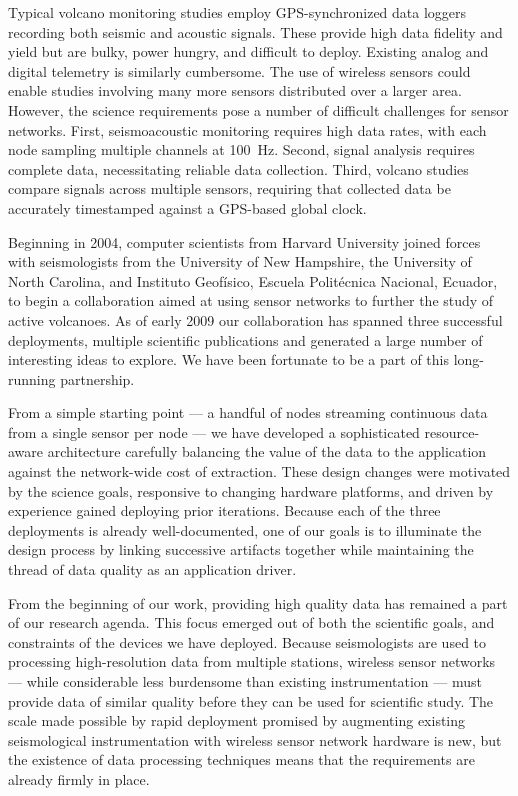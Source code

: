 
Typical volcano monitoring studies employ GPS-synchronized data loggers
recording both seismic and acoustic signals. These provide high data fidelity
and yield but are bulky, power hungry, and difficult to deploy. Existing
analog and digital telemetry is similarly cumbersome.  The use of wireless
sensors could enable studies involving many more sensors distributed over a
larger area. However, the science requirements pose a number of difficult
challenges for sensor networks.  First, seismoacoustic monitoring requires
high data rates, with each node sampling multiple channels at 100~Hz. Second,
signal analysis requires complete data, necessitating reliable data
collection. Third, volcano studies compare signals across multiple sensors,
requiring that collected data be accurately timestamped against a GPS-based
global clock.



Beginning in 2004, computer scientists from Harvard University joined forces
with seismologists from the University of New Hampshire, the University of
North Carolina, and Instituto Geof\'{i}sico, Escuela Polit\'{e}cnica
Nacional, Ecuador, to begin a collaboration aimed at using sensor networks to
further the study of active volcanoes. As of early 2009 our collaboration has
spanned three successful deployments, multiple scientific publications and
generated a large number of interesting ideas to explore.  We have been
fortunate to be a part of this long-running partnership.

From a simple starting point --- a handful of nodes streaming continuous data
from a single sensor per node --- we have developed a sophisticated
resource-aware architecture carefully balancing the value of the data to the
application against the network-wide cost of extraction. These design changes
were motivated by the science goals, responsive to changing hardware
platforms, and driven by experience gained deploying prior iterations.
Because each of the three deployments is already well-documented, one of our
goals is to illuminate the design process by linking successive artifacts
together while maintaining the thread of data quality as an application
driver.

From the beginning of our work, providing high quality data has remained a
part of our research agenda. This focus emerged out of both the scientific
goals, and constraints of the devices we have deployed. Because seismologists
are used to processing high-resolution data from multiple stations, wireless
sensor networks --- while considerable less burdensome than existing
instrumentation --- must provide data of similar quality before they can be
used for scientific study.  The scale made possible by rapid deployment
promised by augmenting existing seismological instrumentation with wireless
sensor network hardware is new, but the existence of data processing
techniques means that the requirements are already firmly in place.

